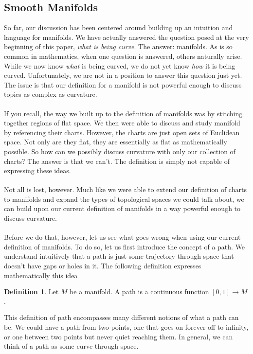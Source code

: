 \documentclass[]{article}
\newcommand\<{\ensuremath{\left\langle}}
\renewcommand\>{\ensuremath{\right\rangle}}
\newcommand{\RR}{\ensuremath{\mathbb{R}}}
\theoremstyle{definition}
\newtheorem{definition}{Definition}[section]
\theoremstyle{definition}
\begin{document}
	
	\subsection*{Smooth Manifolds}
	So far, our discussion has been centered around building up an intuition and language for manifolds. We have actually answered the question posed at the very beginning of this paper, \textit{what is being curve}. The answer: manifolds. As is so common in mathematics, when one question is answered, others naturally arise. While we now know \textit{what} is being curved, we do not yet know \textit{how} it is being curved. Unfortunately, we are not in a position to answer this question just yet. The issue is that our definition for a manifold is not powerful enough to discuss topics as complex as curvature.\\
	\\
	If you recall, the way we built up to the definition of manifolds was by stitching together regions of flat space. We then were able to discuss and study manifold by referencing their charts. However, the charts are just open sets of Euclidean space. Not only are they flat, they are essentially as flat as mathematically possible. So how can we possibly discuss curvature with only our collection of charts? The answer is that we can't. The definition is simply not capable of expressing these ideas.\\
	\\
	Not all is lost, however. Much like we were able to extend our definition of charts to manifolds and expand the types of topological spaces we could talk about, we can build upon our current definition of manifolds in a way powerful enough to discuss curvature.\\
	\\
	Before we do that, however, let us see what goes wrong when using our current definition of manifolds. To do so, let us first introduce the concept of a path. We understand intuitively that a path is just some trajectory through space that doesn't have gaps or holes in it. The following definition expresses mathematically this idea
	\begin{definition}
		Let $M$ be a manifold. A path is a continuous function $[0, 1] \to M$.
	\end{definition}
	This definition of path encompasses many different notions of what a path can be. We could have a path from two points, one that goes on forever off to infinity, or one between two points but never quiet reaching them. In general, we can think of a path as some curve through space.\\
\end{document}
